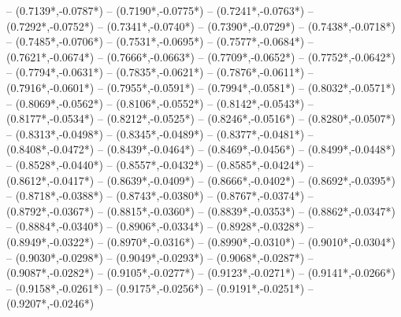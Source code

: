 {	-- ({0.7139*\dx},{-0.0787*\dy})
	-- ({0.7190*\dx},{-0.0775*\dy})
	-- ({0.7241*\dx},{-0.0763*\dy})
	-- ({0.7292*\dx},{-0.0752*\dy})
	-- ({0.7341*\dx},{-0.0740*\dy})
	-- ({0.7390*\dx},{-0.0729*\dy})
	-- ({0.7438*\dx},{-0.0718*\dy})
	-- ({0.7485*\dx},{-0.0706*\dy})
	-- ({0.7531*\dx},{-0.0695*\dy})
	-- ({0.7577*\dx},{-0.0684*\dy})
	-- ({0.7621*\dx},{-0.0674*\dy})
	-- ({0.7666*\dx},{-0.0663*\dy})
	-- ({0.7709*\dx},{-0.0652*\dy})
	-- ({0.7752*\dx},{-0.0642*\dy})
	-- ({0.7794*\dx},{-0.0631*\dy})
	-- ({0.7835*\dx},{-0.0621*\dy})
	-- ({0.7876*\dx},{-0.0611*\dy})
	-- ({0.7916*\dx},{-0.0601*\dy})
	-- ({0.7955*\dx},{-0.0591*\dy})
	-- ({0.7994*\dx},{-0.0581*\dy})
	-- ({0.8032*\dx},{-0.0571*\dy})
	-- ({0.8069*\dx},{-0.0562*\dy})
	-- ({0.8106*\dx},{-0.0552*\dy})
	-- ({0.8142*\dx},{-0.0543*\dy})
	-- ({0.8177*\dx},{-0.0534*\dy})
	-- ({0.8212*\dx},{-0.0525*\dy})
	-- ({0.8246*\dx},{-0.0516*\dy})
	-- ({0.8280*\dx},{-0.0507*\dy})
	-- ({0.8313*\dx},{-0.0498*\dy})
	-- ({0.8345*\dx},{-0.0489*\dy})
	-- ({0.8377*\dx},{-0.0481*\dy})
	-- ({0.8408*\dx},{-0.0472*\dy})
	-- ({0.8439*\dx},{-0.0464*\dy})
	-- ({0.8469*\dx},{-0.0456*\dy})
	-- ({0.8499*\dx},{-0.0448*\dy})
	-- ({0.8528*\dx},{-0.0440*\dy})
	-- ({0.8557*\dx},{-0.0432*\dy})
	-- ({0.8585*\dx},{-0.0424*\dy})
	-- ({0.8612*\dx},{-0.0417*\dy})
	-- ({0.8639*\dx},{-0.0409*\dy})
	-- ({0.8666*\dx},{-0.0402*\dy})
	-- ({0.8692*\dx},{-0.0395*\dy})
	-- ({0.8718*\dx},{-0.0388*\dy})
	-- ({0.8743*\dx},{-0.0380*\dy})
	-- ({0.8767*\dx},{-0.0374*\dy})
	-- ({0.8792*\dx},{-0.0367*\dy})
	-- ({0.8815*\dx},{-0.0360*\dy})
	-- ({0.8839*\dx},{-0.0353*\dy})
	-- ({0.8862*\dx},{-0.0347*\dy})
	-- ({0.8884*\dx},{-0.0340*\dy})
	-- ({0.8906*\dx},{-0.0334*\dy})
	-- ({0.8928*\dx},{-0.0328*\dy})
	-- ({0.8949*\dx},{-0.0322*\dy})
	-- ({0.8970*\dx},{-0.0316*\dy})
	-- ({0.8990*\dx},{-0.0310*\dy})
	-- ({0.9010*\dx},{-0.0304*\dy})
	-- ({0.9030*\dx},{-0.0298*\dy})
	-- ({0.9049*\dx},{-0.0293*\dy})
	-- ({0.9068*\dx},{-0.0287*\dy})
	-- ({0.9087*\dx},{-0.0282*\dy})
	-- ({0.9105*\dx},{-0.0277*\dy})
	-- ({0.9123*\dx},{-0.0271*\dy})
	-- ({0.9141*\dx},{-0.0266*\dy})
	-- ({0.9158*\dx},{-0.0261*\dy})
	-- ({0.9175*\dx},{-0.0256*\dy})
	-- ({0.9191*\dx},{-0.0251*\dy})
	-- ({0.9207*\dx},{-0.0246*\dy})
}
